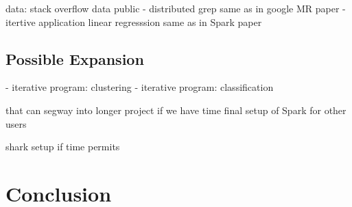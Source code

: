 \documentclass{article}
\begin{document}
data:
stack overflow data public
- distributed grep
    same as in google MR paper
- itertive application linear regresssion
    same as in Spark paper

\subsection*{Possible Expansion}
- iterative program: clustering
- iterative program: classification

that can segway into longer project if we have time
final setup of Spark for other users

shark setup if time permits






\section*{Conclusion}




\end{document}
